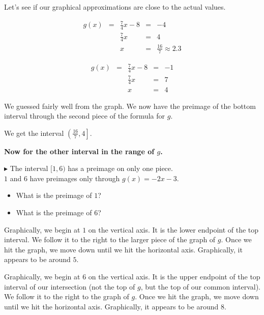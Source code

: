 \documentclass{ximera}
\begin{document}
Let's see if our graphical approximations are close to the actual values.




\begin{align*}
g(x) & = & \frac{7}{4}x - 8  & = & -4 \\
     &   & \frac{7}{4}x      & = & 4  \\
     &   & x                 & = & \frac{16}{7} \approx 2.3
\end{align*}



\begin{align*}
g(x) & = & \frac{7}{4}x - 8  & = & -1 \\
     &   & \frac{7}{4}x      & = & 7  \\
     &   & x                 & = & 4
\end{align*}







We guessed fairly well from the graph.  We now have the preimage of the bottom interval through the second piece of the formula for $g$.  


We get the interval $\left( \frac{16}{7}, 4 \right]$.





\textbf{Now for the other interval in the range of $g$.}




$\blacktriangleright$ The interval $[1, 6)$ has a preimage on only one piece. \\
$1$ and $6$ have preimages only through $g(x) = -2x-3$.





\begin{itemize}
\item What is the preimage of $1$? 
\item What is the preimage of $6$? 
\end{itemize}



Graphically, we begin at $1$ on the vertical axis.  It is the lower endpoint of the top interval.  We follow it to the right to the larger piece of the graph of $g$.  Once we hit the graph, we move down until we hit the horizontal axis.  Graphically, it appears to be around $5$.


Graphically, we begin at $6$ on the vertical axis.  It is the upper endpoint of the top interval of our intersection (not the top of $g$, but the top of our common interval).  We follow it to the right to the graph of $g$.  Once we hit the graph, we move down until we hit the horizontal axis.  Graphically, it appears to be around $8$.
\end{document}
